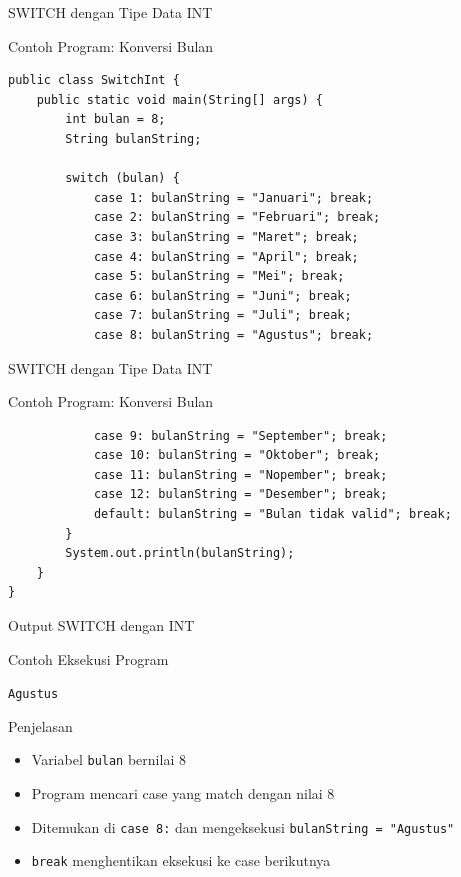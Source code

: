 \documentclass{beamer}
\begin{document}
\begin{frame}[fragile]{SWITCH dengan Tipe Data INT}
  \begin{exampleblock}{Contoh Program: Konversi Bulan}
    \begin{lstlisting}
public class SwitchInt {
    public static void main(String[] args) {
        int bulan = 8;
        String bulanString;
        
        switch (bulan) {
            case 1: bulanString = "Januari"; break;
            case 2: bulanString = "Februari"; break;
            case 3: bulanString = "Maret"; break;
            case 4: bulanString = "April"; break;
            case 5: bulanString = "Mei"; break;
            case 6: bulanString = "Juni"; break;
            case 7: bulanString = "Juli"; break;
            case 8: bulanString = "Agustus"; break;
    \end{lstlisting}
  \end{exampleblock}
\end{frame}


\begin{frame}[fragile]{SWITCH dengan Tipe Data INT}
  \begin{exampleblock}{Contoh Program: Konversi Bulan}
    \begin{lstlisting}
            case 9: bulanString = "September"; break;
            case 10: bulanString = "Oktober"; break;
            case 11: bulanString = "Nopember"; break;
            case 12: bulanString = "Desember"; break;
            default: bulanString = "Bulan tidak valid"; break;
        }
        System.out.println(bulanString);
    }
}
    \end{lstlisting}
  \end{exampleblock}
\end{frame}

\begin{frame}{Output SWITCH dengan INT}
\begin{block}{Contoh Eksekusi Program}
\colorbox{gray!20}{
    \parbox{0.9\textwidth}{
        \texttt{Agustus}
    }
}
\end{block}

\begin{block}{Penjelasan}
\begin{itemize}
\item Variabel \texttt{bulan} bernilai 8
\item Program mencari case yang match dengan nilai 8
\item Ditemukan di \texttt{case 8:} dan mengeksekusi \texttt{bulanString = "Agustus"}
\item \texttt{break} menghentikan eksekusi ke case berikutnya
\end{itemize}
\end{block}
\end{frame}
\end{document}
